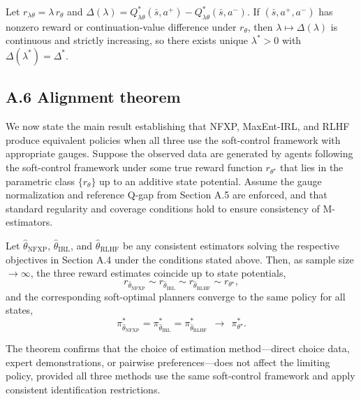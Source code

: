 \begin{proposition}
\label{prop:qgap}
Let $r_{\lambda\theta}=\lambda\,r_\theta$ and $\Delta(\lambda)=Q^{\ast}_{\lambda\theta}(\bar s,a^+)-Q^{\ast}_{\lambda\theta}(\bar s,a^-)$.
If $(\bar s,a^+,a^-)$ has nonzero reward or continuation-value difference under $r_\theta$, then $\lambda\mapsto \Delta(\lambda)$ is continuous and strictly increasing, so there exists unique $\lambda^{\ast}>0$ with $\Delta(\lambda^{\ast})=\Delta^{\ast}$.
\end{proposition}

\subsection*{A.6 Alignment theorem}
We now state the main result establishing that NFXP, MaxEnt-IRL, and RLHF produce equivalent policies when all three use the soft-control framework with appropriate gauges. Suppose the observed data are generated by agents following the soft-control framework under some true reward function $r_{\theta^\star}$ that lies in the parametric class $\{r_\theta\}$ up to an additive state potential. Assume the gauge normalization and reference Q-gap from Section A.5 are enforced, and that standard regularity and coverage conditions hold to ensure consistency of M-estimators.
\begin{thm}
\label{thm:alignment}
Let $\hat\theta_{\text{NFXP}}$, $\hat\theta_{\text{IRL}}$, and $\hat\theta_{\text{RLHF}}$ be any consistent estimators solving the respective objectives in Section A.4 under the conditions stated above.
Then, as sample size $\to\infty$, the three reward estimates coincide up to state potentials,
\[
r_{\hat\theta_{\text{NFXP}}}\sim r_{\hat\theta_{\text{IRL}}}\sim r_{\hat\theta_{\text{RLHF}}}\sim r_{\theta^\star},
\]
and the corresponding soft-optimal planners converge to the same policy for all states,
\[
\pi^{\ast}_{\hat\theta_{\text{NFXP}}}=\pi^{\ast}_{\hat\theta_{\text{IRL}}}=\pi^{\ast}_{\hat\theta_{\text{RLHF}}}\ \ \xrightarrow{\ \ }\ \ \pi^{\ast}_{\theta^\star}.
\]
\end{thm}
The theorem confirms that the choice of estimation method---direct choice data, expert demonstrations, or pairwise preferences---does not affect the limiting policy, provided all three methods use the same soft-control framework and apply consistent identification restrictions.

